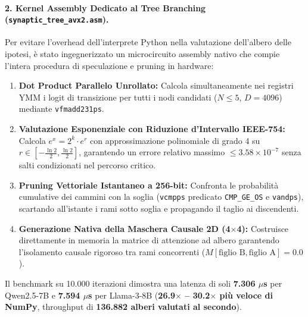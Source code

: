 \documentclass[10pt,a4paper]{article}
\theoremstyle{definition}
\begin{document}
\paragraph{2. Kernel Assembly Dedicato al Tree Branching (\texttt{synaptic\_tree\_avx2.asm}).}
Per evitare l'overhead dell'interprete Python nella valutazione dell'albero delle ipotesi, è stato ingegnerizzato un microcircuito assembly nativo che compie l'intera procedura di speculazione e pruning in hardware:
\begin{enumerate}[leftmargin=1.5em]
    \item \textbf{Dot Product Parallelo Unrollato:} Calcola simultaneamente nei registri YMM i logit di transizione per tutti i nodi candidati ($N \le 5$, $D=4096$) mediante \texttt{vfmadd231ps}.
    \item \textbf{Valutazione Esponenziale con Riduzione d'Intervallo IEEE-754:} Calcola $e^x = 2^k \cdot e^r$ con approssimazione polinomiale di grado 4 su $r \in [-\frac{\ln 2}{2}, \frac{\ln 2}{2}]$, garantendo un errore relativo massimo $\le 3.58 \times 10^{-7}$ senza salti condizionati nel percorso critico.
    \item \textbf{Pruning Vettoriale Istantaneo a 256-bit:} Confronta le probabilità cumulative dei cammini con la soglia (\texttt{vcmpps} predicato \texttt{CMP\_GE\_OS} e \texttt{vandps}), scartando all'istante i rami sotto soglia e propagando il taglio ai discendenti.
    \item \textbf{Generazione Nativa della Maschera Causale 2D (4$\times$4):} Costruisce direttamente in memoria la matrice di attenzione ad albero garantendo l'isolamento causale rigoroso tra rami concorrenti ($M[\text{figlio B}, \text{figlio A}] = 0.0$).
\end{enumerate}
Il benchmark su 10.000 iterazioni dimostra una latenza di soli \textbf{7.306 $\mu$s} per Qwen2.5-7B e \textbf{7.594 $\mu$s} per Llama-3-8B (\textbf{26.9$\times$ -- 30.2$\times$ più veloce di NumPy}, throughput di \textbf{136.882 alberi valutati al secondo}).
\end{document}
